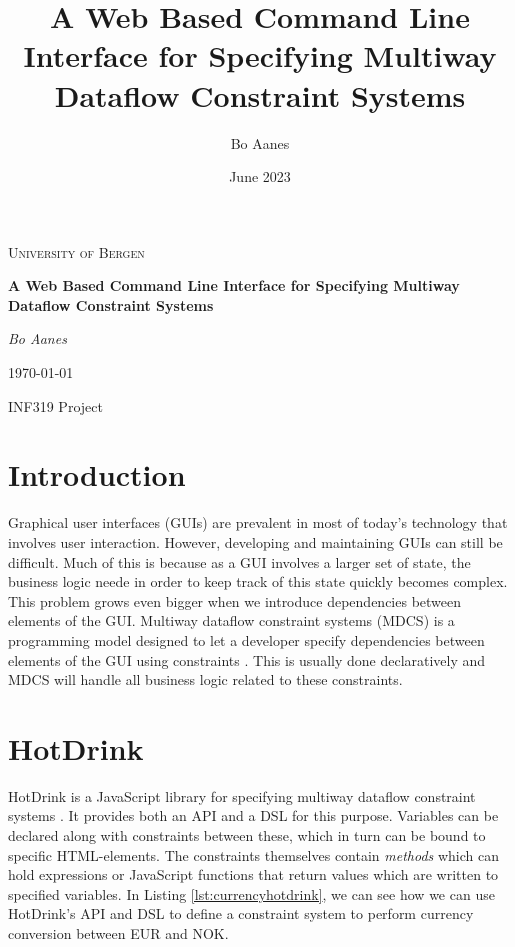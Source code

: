 \documentclass[11pt, a4paper]{article}
\title{A Web Based Command Line Interface for Specifying Multiway Dataflow Constraint Systems}
\author{Bo Aanes}
\date{June 2023}
\begin{document}
\begin{titlepage}
    \centering
    \vspace*{\fill}
    {\scshape\LARGE University of Bergen\par}
    \vspace{1.5cm}
    {\huge\bfseries A Web Based Command Line Interface for Specifying Multiway Dataflow Constraint Systems\par}
    \vspace{2cm}
    {\Large\itshape Bo Aanes\par}
    \vfill
    {\large \today\par}
    \vspace{1cm}
    {\large INF319 Project\par}
    \vfill
\end{titlepage}
\tableofcontents
\clearpage

\section{Introduction}
Graphical user interfaces (GUIs) are prevalent in most of today's technology that involves user interaction. However, developing and maintaining GUIs can still be difficult. Much of this is because as a GUI involves a larger set of state, the business logic neede in order to keep track of this state quickly becomes complex. This problem grows even bigger when we introduce dependencies between elements of the GUI. Multiway dataflow constraint systems (MDCS) is a programming model designed to let a developer specify dependencies between elements of the GUI using constraints \cite{semantics}. This is usually done declaratively and MDCS will handle all business logic related to these constraints. 

\section{HotDrink}
HotDrink is a JavaScript library for specifying multiway dataflow constraint systems \cite{hotdrink}. It provides both an API and a DSL for this purpose. Variables can be declared along with constraints between these, which in turn can be bound to specific HTML-elements. The constraints themselves contain \textit{methods} which can hold expressions or JavaScript functions that return values which are written to specified variables. In Listing \ref{lst:currencyhotdrink}, we can see how we can use HotDrink's API and DSL to define a constraint system to perform currency conversion between EUR and NOK.
\end{document}
